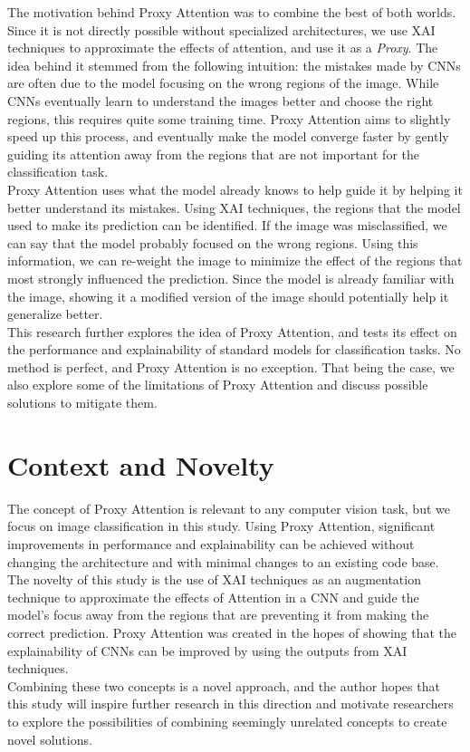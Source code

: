 The motivation behind Proxy Attention was to combine the best of both worlds. Since it is not directly possible without specialized architectures, we use XAI techniques to approximate the effects of attention, and use it as a \textit{Proxy}. The idea behind it stemmed from the following intuition: the mistakes made by CNNs are often due to the model focusing on the wrong regions of the image. While CNNs eventually learn to understand the images better and choose the right regions, this requires quite some training time. Proxy Attention aims to slightly speed up this process, and eventually make the model converge faster by gently guiding its attention away from the regions that are not important for the classification task.\\
Proxy Attention uses what the model already knows to help guide it by helping it better understand its mistakes. Using XAI techniques, the regions that the model used to make its prediction can be identified. If the image was misclassified, we can say that the model probably focused on the wrong regions. Using this information, we can re-weight the image to minimize the effect of the regions that most strongly influenced the prediction. Since the model is already familiar with the image, showing it a modified version of the image should potentially help it generalize better.\\
This research further explores the idea of Proxy Attention, and tests its effect on the performance and explainability of standard models for classification tasks. No method is perfect, and Proxy Attention is no exception. That being the case, we also explore some of the limitations of Proxy Attention and discuss possible solutions to mitigate them.

\section{Context and Novelty}
The concept of Proxy Attention is relevant to any computer vision task, but we focus on image classification in this study. Using Proxy Attention, significant improvements in performance and explainability can be achieved without changing the architecture and with minimal changes to an existing code base.\\
The novelty of this study is the use of XAI techniques as an augmentation technique to approximate the effects of Attention in a CNN and guide the model's focus away from the regions that are preventing it from making the correct prediction. Proxy Attention was created in the hopes of showing that the explainability of CNNs can be improved by using the outputs from XAI techniques.\\
Combining these two concepts is a novel approach, and the author hopes that this study will inspire further research in this direction and motivate researchers to explore the possibilities of combining seemingly unrelated concepts to create novel solutions.

